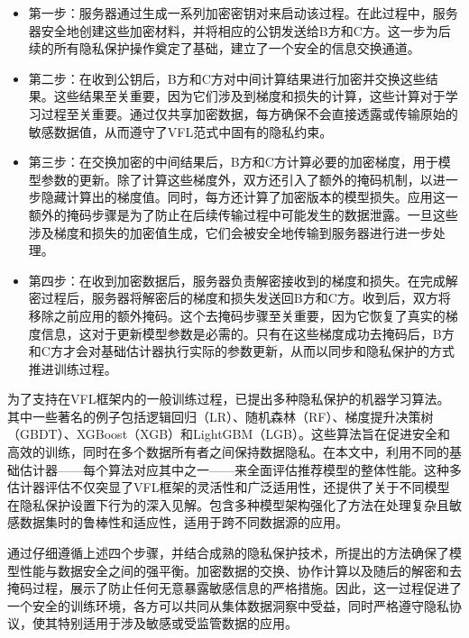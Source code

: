 \begin{itemize}
	\item 第一步：服务器通过生成一系列加密密钥对来启动该过程。在此过程中，服务器安全地创建这些加密材料，并将相应的公钥发送给B方和C方。这一步为后续的所有隐私保护操作奠定了基础，建立了一个安全的信息交换通道。
	
	\item 第二步：在收到公钥后，B方和C方对中间计算结果进行加密并交换这些结果。这些结果至关重要，因为它们涉及到梯度和损失的计算，这些计算对于学习过程至关重要。通过仅共享加密数据，每方确保不会直接透露或传输原始的敏感数据值，从而遵守了VFL范式中固有的隐私约束。
	
	\item 第三步：在交换加密的中间结果后，B方和C方计算必要的加密梯度，用于模型参数的更新。除了计算这些梯度外，双方还引入了额外的掩码机制，以进一步隐藏计算出的梯度值。同时，每方还计算了加密版本的模型损失。应用这一额外的掩码步骤是为了防止在后续传输过程中可能发生的数据泄露。一旦这些涉及梯度和损失的加密值生成，它们会被安全地传输到服务器进行进一步处理。
	
	\item 第四步：在收到加密数据后，服务器负责解密接收到的梯度和损失。在完成解密过程后，服务器将解密后的梯度和损失发送回B方和C方。收到后，双方将移除之前应用的额外掩码。这个去掩码步骤至关重要，因为它恢复了真实的梯度信息，这对于更新模型参数是必需的。只有在这些梯度成功去掩码后，B方和C方才会对基础估计器执行实际的参数更新，从而以同步和隐私保护的方式推进训练过程。
\end{itemize}

为了支持在VFL框架内的一般训练过程，已提出多种隐私保护的机器学习算法\citep{yang2019federated}。其中一些著名的例子包括逻辑回归（LR）\citep{he2021secure,yang2019parallel}、随机森林（RF）\citep{yao2022efficient}、梯度提升决策树（GBDT）\citep{he2021secure}、XGBoost（XGB）\citep{xu2021efficient,wang2022feverless}和LightGBM（LGB）\citep{feng2019securegbm}。这些算法旨在促进安全和高效的训练，同时在多个数据所有者之间保持数据隐私。在本文中，利用不同的基础估计器——每个算法对应其中之一——来全面评估推荐模型的整体性能。这种多估计器评估不仅突显了VFL框架的灵活性和广泛适用性，还提供了关于不同模型在隐私保护设置下行为的深入见解。包含多种模型架构强化了方法在处理复杂且敏感数据集时的鲁棒性和适应性，适用于跨不同数据源的应用。

通过仔细遵循上述四个步骤，并结合成熟的隐私保护技术，所提出的方法确保了模型性能与数据安全之间的强平衡。加密数据的交换、协作计算以及随后的解密和去掩码过程，展示了防止任何无意暴露敏感信息的严格措施。因此，这一过程促进了一个安全的训练环境，各方可以共同从集体数据洞察中受益，同时严格遵守隐私协议，使其特别适用于涉及敏感或受监管数据的应用。 

